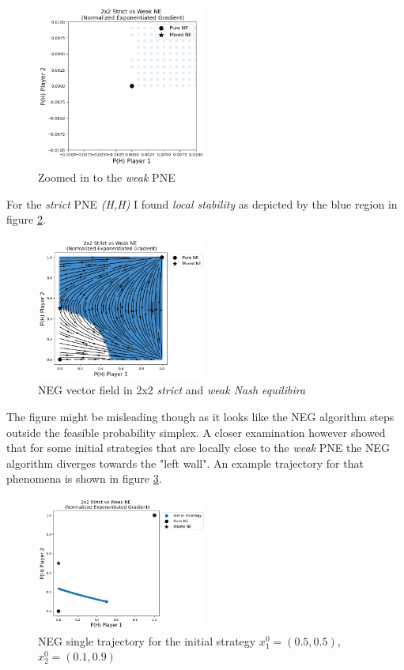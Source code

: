 \begin{figure}[H]
    \centering
    \includegraphics[width=0.5\textwidth]{logos/Weak1.png}
    \caption{Zoomed in to the \textit{weak} PNE}
    \label{fig:Weak1}
\end{figure}

For the \textit{strict} PNE \textit{(H,H)} I found \textit{local stability} as depicted by the blue region in figure \ref{fig:Weak2}. 

\begin{figure}[H]
    \centering
    \includegraphics[width=0.5\textwidth]{logos/Weak2.png}
    \caption{NEG vector field in 2x2 \textit{strict} and \textit{weak Nash equilibira}}
    \label{fig:Weak2}
\end{figure}

The figure might be misleading though as it looks like the NEG algorithm steps outside the feasible probability simplex. A closer examination however showed that for some initial strategies that are locally close to the \textit{weak} PNE the NEG algorithm diverges towards the "left wall". An example trajectory for that phenomena is shown in figure \ref{fig:Weak4}.

\begin{figure}[H]
    \centering
    \includegraphics[width=0.5\textwidth]{logos/Weak4.png}
    \caption{NEG single trajectory for the initial strategy $x_{1}^{0} = (0.5,0.5)$, $x_{2}^{0} = (0.1,0.9)$}
    \label{fig:Weak4}
\end{figure}

